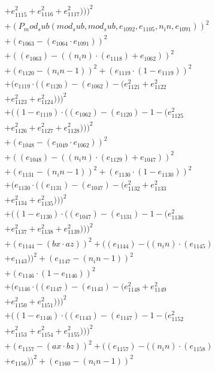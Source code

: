 \documentclass[10pt, a4paper]{article}
\begin{document}
\begin{align*}
& + e_{1115}^{2} + e_{1116}^{2} + e_{1117}^{2})))^{2} \\
& + (P_mod_sub(mod_sub, mod_sub, e_{1092}, e_{1105}, n_in, e_{1091}))^{2} \\
& + (e_{1063} - (e_{1064}  \cdot  e_{1091}))^{2} \\
& + ((e_{1063}) - ((n_in)  \cdot  (e_{1118}) + e_{1062}))^{2} \\
& + (e_{1120} - (n_in - 1))^{2} + (e_{1119}  \cdot  (1 - e_{1119}))^{2} \\
& + (e_{1119}  \cdot  ((e_{1120}) - (e_{1062}) - (e_{1121}^{2} + e_{1122}^{2} \\
& + e_{1123}^{2} + e_{1124}^{2})))^{2} \\
& + ((1 - e_{1119})  \cdot  ((e_{1062}) - (e_{1120}) - 1 - (e_{1125}^{2} \\
& + e_{1126}^{2} + e_{1127}^{2} + e_{1128}^{2})))^{2} \\
& + (e_{1048} - (e_{1049}  \cdot  e_{1062}))^{2} \\
& + ((e_{1048}) - ((n_in)  \cdot  (e_{1129}) + e_{1047}))^{2} \\
& + (e_{1131} - (n_in - 1))^{2} + (e_{1130}  \cdot  (1 - e_{1130}))^{2} \\
& + (e_{1130}  \cdot  ((e_{1131}) - (e_{1047}) - (e_{1132}^{2} + e_{1133}^{2} \\
& + e_{1134}^{2} + e_{1135}^{2})))^{2} \\
& + ((1 - e_{1130})  \cdot  ((e_{1047}) - (e_{1131}) - 1 - (e_{1136}^{2} \\
& + e_{1137}^{2} + e_{1138}^{2} + e_{1139}^{2})))^{2} \\
& + (e_{1144} - (bx  \cdot  az))^{2} + ((e_{1144}) - ((n_in)  \cdot  (e_{1145}) \\
& + e_{1143}))^{2} + (e_{1147} - (n_in - 1))^{2} \\
& + (e_{1146}  \cdot  (1 - e_{1146}))^{2} \\
& + (e_{1146}  \cdot  ((e_{1147}) - (e_{1143}) - (e_{1148}^{2} + e_{1149}^{2} \\
& + e_{1150}^{2} + e_{1151}^{2})))^{2} \\
& + ((1 - e_{1146})  \cdot  ((e_{1143}) - (e_{1147}) - 1 - (e_{1152}^{2} \\
& + e_{1153}^{2} + e_{1154}^{2} + e_{1155}^{2})))^{2} \\
& + (e_{1157} - (ax  \cdot  bz))^{2} + ((e_{1157}) - ((n_in)  \cdot  (e_{1158}) \\
& + e_{1156}))^{2} + (e_{1160} - (n_in - 1))^{2} \\

\end{align*}
\end{document}
